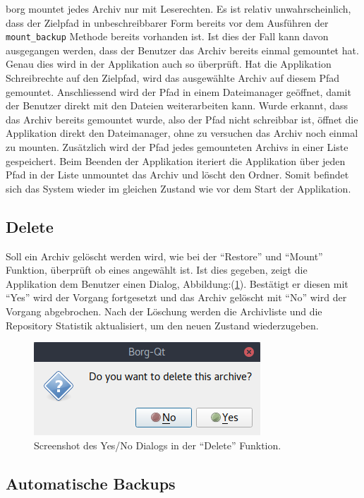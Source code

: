 \gls{borg} mountet jedes Archiv nur mit Leserechten. Es ist relativ
unwahrscheinlich, dass der Zielpfad in unbeschreibbarer Form bereits vor dem
Ausführen der \texttt{mount\_backup} Methode bereits vorhanden ist. Ist dies der Fall
kann davon ausgegangen werden, dass der Benutzer das Archiv bereits einmal
gemountet hat. Genau dies wird in der Applikation auch so überprüft. Hat die
Applikation Schreibrechte auf den Zielpfad, wird das ausgewählte Archiv auf
diesem Pfad gemountet. Anschliessend wird der Pfad in einem Dateimanager
geöffnet, damit der Benutzer direkt mit den Dateien weiterarbeiten kann. Wurde
erkannt, dass das Archiv bereits gemountet wurde, also der Pfad nicht
schreibbar ist, öffnet die Applikation direkt den Dateimanager, ohne zu
versuchen das Archiv noch einmal zu mounten.
\newpage
Zusätzlich wird der Pfad jedes gemounteten Archivs in einer Liste gespeichert.
Beim Beenden der Applikation iteriert die Applikation über jeden Pfad in der
Liste unmountet das Archiv und löscht den Ordner. Somit befindet sich das
System wieder im gleichen Zustand wie vor dem Start der Applikation.

\subsection{Delete}
\label{sec:org387e3f8}

Soll ein Archiv gelöscht werden wird, wie bei der "`Restore"' und "`Mount"'
Funktion, überprüft ob eines angewählt ist. Ist dies gegeben, zeigt die
Applikation dem Benutzer einen Dialog, Abbildung:(\ref{fig:orgf3d4105}). Bestätigt er
diesen mit "`Yes"' wird der Vorgang fortgesetzt und das Archiv gelöscht mit "`No"'
wird der Vorgang abgebrochen. Nach der Löschung werden die Archivliste und die
Repository Statistik aktualisiert, um den neuen Zustand wiederzugeben.

\begin{figure}[H]
\centering
\includegraphics[width=.3\paperwidth]{pictures/borgqt_yes_no.png}
\caption{\label{fig:orgf3d4105}
Screenshot des Yes/No Dialogs in der "`Delete"' Funktion.}
\end{figure}
\subsection{Automatische Backups}
\label{sec:org99bb44c}

